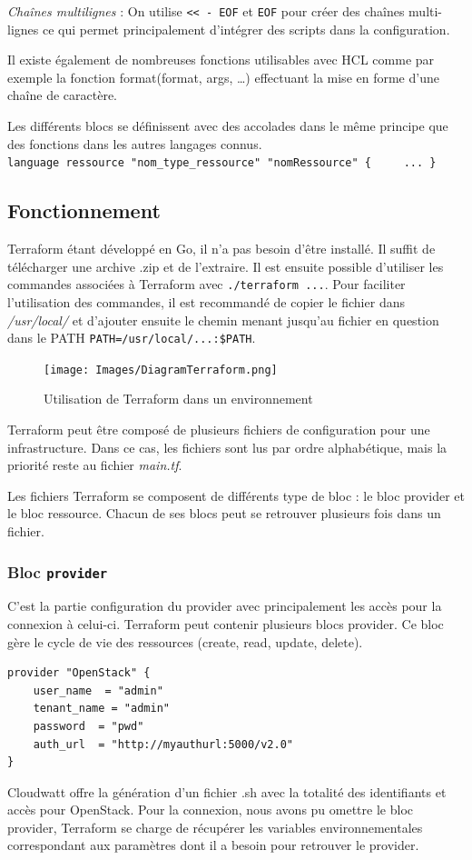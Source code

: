 \documentclass[]{article}
\begin{document}
\emph{Chaînes multilignes} : On utilise
\texttt{\textless{}\textless{}\ -\ EOF} et \texttt{EOF} pour créer des
chaînes multi-lignes ce qui permet principalement d'intégrer des scripts
dans la configuration.

Il existe également de nombreuses fonctions utilisables avec HCL comme
par exemple la fonction format(format, args, \ldots{}) effectuant la mise en forme d'une chaîne de caractère.

Les différents blocs se définissent avec des accolades dans le même
principe que des fonctions dans les autres langages connus.
\texttt{language\ ressource\ "nom\_type\_ressource"\ "nomRessource"\ \{\ \ \ \ \ ...\ \}}

\subsection{Fonctionnement}\label{fonctionnement}

Terraform étant développé en Go, il n'a pas besoin d'être installé. Il
suffit de télécharger une archive .zip et de l'extraire. Il est ensuite
possible d'utiliser les commandes associées à Terraform avec
\texttt{./terraform\ ...}. Pour faciliter l'utilisation des commandes,
il est recommandé de copier le fichier dans \emph{/usr/local/} et
d'ajouter ensuite le chemin menant jusqu'au fichier en question dans le
PATH \texttt{PATH=/usr/local/...:\$PATH}.

\begin{figure}
\centering
\texttt{[image: Images/DiagramTerraform.png]}
\caption{Utilisation de Terraform dans un environnement}
\end{figure}

Terraform peut être composé de plusieurs fichiers de configuration pour
une infrastructure. Dans ce cas, les fichiers sont lus par ordre
alphabétique, mais la priorité reste au fichier \emph{main.tf}.

Les fichiers Terraform se composent de différents type de bloc : le bloc
provider et le bloc ressource. Chacun de ses blocs peut se retrouver
plusieurs fois dans un fichier.

\subsubsection{\texorpdfstring{Bloc
\textbf{\texttt{provider}}}{Bloc provider}}\label{bloc-provider}

C'est la partie configuration du provider avec principalement les accès
pour la connexion à celui-ci. Terraform peut contenir plusieurs blocs
provider. Ce bloc gère le cycle de vie des ressources (create, read,
update, delete).
\begin{verbatim}
provider "OpenStack" {
    user_name  = "admin"
    tenant_name = "admin"
    password  = "pwd"
    auth_url  = "http://myauthurl:5000/v2.0"
}
\end{verbatim}
Cloudwatt offre la génération d'un fichier .sh avec la totalité des
identifiants et accès pour OpenStack. Pour la connexion, nous avons pu
omettre le bloc provider, Terraform se charge de récupérer les variables
environnementales correspondant aux paramètres dont il a besoin pour
retrouver le provider.
\end{document}
